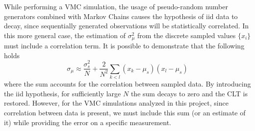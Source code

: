 While performing a VMC simulation, the usage of pseudo-random number generators combined with Markov Chains causes the hypothesis of iid data to decay, since sequentially generated observations will be  statistically correlated. In this more general case, the estimation of $\sigma_\mu^2$ from the discrete sampled values $\{ x_i \}$ must include a correlation term. It is possible to demonstrate that the following holds
\begin{equation}
    \sigma_\mu \approx \frac{\sigma_s^2}{N} + \frac{2}{N^2} \sum_{k<l} (x_k - \mu_s) (x_l - \mu_s)  
    \label{err_covariance}
\end{equation}
where the sum accounts for the correlation between sampled data. By introducing the iid hypothesis, for sufficiently large $N$ the sum decays to zero and the CLT is restored. However, for the VMC simulations analyzed in this project, since correlation between data is present, we must include this sum (or an estimate of it) while providing the error on a specific measurement.



